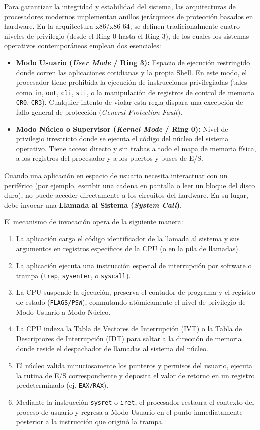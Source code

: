 \documentclass[11pt,letterpaper]{article}
\begin{document}
Para garantizar la integridad y estabilidad del sistema, las arquitecturas de procesadores modernos implementan anillos jerárquicos de protección basados en hardware. En la arquitectura x86/x86-64, se definen tradicionalmente cuatro niveles de privilegio (desde el Ring 0 hasta el Ring 3), de los cuales los sistemas operativos contemporáneos emplean dos esenciales:
\begin{itemize}
    \item \textbf{Modo Usuario (\textit{User Mode} / Ring 3):} Espacio de ejecución restringido donde corren las aplicaciones cotidianas y la propia Shell. En este modo, el procesador tiene prohibida la ejecución de instrucciones privilegiadas (tales como \texttt{in}, \texttt{out}, \texttt{cli}, \texttt{sti}, o la manipulación de registros de control de memoria \texttt{CR0}, \texttt{CR3}). Cualquier intento de violar esta regla dispara una excepción de fallo general de protección (\textit{General Protection Fault}).
    \item \textbf{Modo Núcleo o Supervisor (\textit{Kernel Mode} / Ring 0):} Nivel de privilegio irrestricto donde se ejecuta el código del núcleo del sistema operativo. Tiene acceso directo y sin trabas a todo el mapa de memoria física, a los registros del procesador y a los puertos y buses de E/S.
\end{itemize}

Cuando una aplicación en espacio de usuario necesita interactuar con un periférico (por ejemplo, escribir una cadena en pantalla o leer un bloque del disco duro), no puede acceder directamente a los circuitos del hardware. En su lugar, debe invocar una \textbf{Llamada al Sistema (\textit{System Call})}. 

El mecanismo de invocación opera de la siguiente manera:
\begin{enumerate}
    \item La aplicación carga el código identificador de la llamada al sistema y sus argumentos en registros específicos de la CPU (o en la pila de llamadas).
    \item La aplicación ejecuta una instrucción especial de interrupción por software o trampa (\texttt{trap}, \texttt{sysenter}, o \texttt{syscall}).
    \item La CPU suspende la ejecución, preserva el contador de programa y el registro de estado (\texttt{FLAGS/PSW}), conmutando atómicamente el nivel de privilegio de Modo Usuario a Modo Núcleo.
    \item La CPU indexa la Tabla de Vectores de Interrupción (IVT) o la Tabla de Descriptores de Interrupción (IDT) para saltar a la dirección de memoria donde reside el despachador de llamadas al sistema del núcleo.
    \item El núcleo valida minuciosamente los punteros y permisos del usuario, ejecuta la rutina de E/S correspondiente y deposita el valor de retorno en un registro predeterminado (ej. \texttt{EAX/RAX}).
    \item Mediante la instrucción \texttt{sysret} o \texttt{iret}, el procesador restaura el contexto del proceso de usuario y regresa a Modo Usuario en el punto inmediatamente posterior a la instrucción que originó la trampa.
\end{enumerate}
\end{document}
